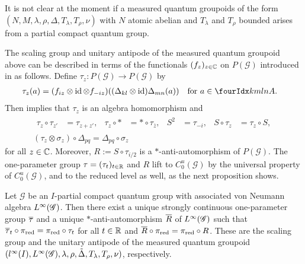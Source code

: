 \begin{Rem} It is not clear at the moment if a measured quantum groupoids of the form $(N,M, \lambda,\rho,\Delta,
  T_{\lambda},T_{\rho},\nu)$ with $N$ atomic abelian and $T_{\lambda}$ and $T_{\rho}$ bounded arises from a partial compact quantum group. 
  \end{Rem}
  
The scaling group and unitary antipode of the measured quantum
groupoid above can be described in terms of the functionals
$(f_{z})_{z\in \mathbb{C}}$ on $P(\mathscr{G})$ introduced in \cite[Theorem
2.25]{DCT1} as follows.  Define $\tau_{z} \colon P(\mathscr{G}) \to
P(\mathscr{G})$ by
\begin{align*}
\tau_{z}(a) &= (f_{iz} \otimes \id \otimes f_{-iz})((\Delta_{kl}
\otimes \id)\Delta_{mn}(a)) \quad \text{for } a\in \Gr{A}{k}{l}{m}{n}.
\end{align*}
Then \cite[Theorem 2.25]{DCT1} implies that $\tau_{z}$ is an algebra
homomorphism and
\begin{gather} \label{eq:alg-scale}
  \begin{aligned}
    \tau_{z} \circ \tau_{z'} &= \tau_{z+z'}, & \tau_{z}\circ \ast &=
    \ast\circ \tau_{\overline{z}}, & S^{2} &= \tau_{-i}, & S \circ
    \tau_{z} &= \tau_{z} \circ S,
  \end{aligned}
 \\  \label{eq:alg-mod-aut-delta} (\tau_{z} \otimes \sigma_{z})
    \circ \Delta_{pq} = \Delta_{pq} \circ \sigma_{z}
  \end{gather}
for all $z\in \mathbb{C}$. Moreover, $R:=S\circ
\tau_{i/2}$ is a $*$-anti-automorphism of $P(\mathscr{G})$.  The
one-parameter group $\tau=(\tau_{t})_{t\in \mathbb{R}}$ and $R$ lift to
$C^{u}_{0}(\mathscr{G})$ by the universal property of
$C^{u}_{0}(\mathscr{G})$, and to the reduced level as well, as the next proposition shows.
\begin{Prop}
  Let $\mathscr{G}$ be an $I$-partial compact quantum group with
  associated von Neumann algebra $L^{\infty}(\mathscr{G})$. Then there exist
a unique strongly continuous one-parameter group $\overline{\tau}$ and
 a unique $*$-anti-automorphism $\overline{R}$ of $L^{\infty}(\mathscr{G})$ such that
 $\overline{\tau}_{t} \circ \pi_{\operatorname{\mathrm{red}}} = \pi_{\operatorname{\mathrm{red}}} \circ
\tau_{t}$ for  all $t\in \mathbb{R}$ and
$\overline{R} \circ \pi_{\operatorname{\mathrm{red}}} = \pi_{\operatorname{\mathrm{red}}} \circ R$.
 These are the scaling group and the unitary antipode of the measured
 quantum groupoid $(l^{\infty}(I),L^{\infty}(\mathscr{G}), \lambda,\rho,\tilde\Delta,
 T_{\lambda},T_{\rho},\nu)$, respectively.
\end{Prop}
